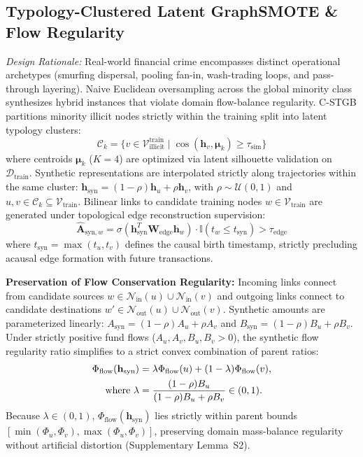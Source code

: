 \subsection{Typology-Clustered Latent GraphSMOTE \& Flow Regularity}
\label{sec:graph_smote}
\textit{Design Rationale:} Real-world financial crime encompasses distinct operational archetypes (smurfing dispersal, pooling fan-in, wash-trading loops, and pass-through layering). Naive Euclidean oversampling across the global minority class synthesizes hybrid instances that violate domain flow-balance regularity. C-STGB partitions minority illicit nodes strictly within the training split into latent typology clusters:
\begin{equation}
\mathcal{C}_k = \{ v \in \mathcal{V}_{\text{illicit}}^{\text{train}} \mid \cos(\mathbf{h}_v, \boldsymbol{\mu}_k) \ge \tau_{\text{sim}} \}
\end{equation}
where centroids $\boldsymbol{\mu}_k$ ($K=4$) are optimized via latent silhouette validation on $\mathcal{D}_{\text{train}}$. Synthetic representations are interpolated strictly along trajectories within the same cluster: $\mathbf{h}_{\text{syn}} = (1 - \rho) \mathbf{h}_u + \rho \mathbf{h}_v$, with $\rho \sim \mathcal{U}(0, 1)$ and $u, v \in \mathcal{C}_k \subseteq \mathcal{V}_{\text{train}}$. Bilinear links to candidate training nodes $w \in \mathcal{V}_{\text{train}}$ are generated under topological edge reconstruction supervision:
\begin{equation}
\hat{\mathbf{A}}_{\text{syn}, w} = \sigma\left( \mathbf{h}_{\text{syn}}^T \mathbf{W}_{\text{edge}} \mathbf{h}_w \right) \cdot \mathbb{I}(t_w \le t_{\text{syn}}) > \tau_{\text{edge}}
\end{equation}
where $t_{\text{syn}} = \max(t_u, t_v)$ defines the causal birth timestamp, strictly precluding acausal edge formation with future transactions.

\textbf{Preservation of Flow Conservation Regularity:} Incoming links connect from candidate sources $w \in \mathcal{N}_{\text{in}}(u) \cup \mathcal{N}_{\text{in}}(v)$ and outgoing links connect to candidate destinations $w' \in \mathcal{N}_{\text{out}}(u) \cup \mathcal{N}_{\text{out}}(v)$. Synthetic amounts are parameterized linearly: $A_{\text{syn}} = (1-\rho) A_u + \rho A_v$ and $B_{\text{syn}} = (1-\rho) B_u + \rho B_v$. Under strictly positive fund flows ($A_u, A_v, B_u, B_v > 0$), the synthetic flow regularity ratio simplifies to a strict convex combination of parent ratios:
\begin{align}
\Phi_{\text{flow}}(\mathbf{h}_{\text{syn}}) &= \lambda \Phi_{\text{flow}}(u) + (1-\lambda) \Phi_{\text{flow}}(v), \label{eq:synthetic_flow} \\
\text{where } \lambda &= \frac{(1-\rho) B_u}{(1-\rho) B_u + \rho B_v} \in (0, 1). \notag
\end{align}
Because $\lambda \in (0, 1)$, $\Phi_{\text{flow}}(\mathbf{h}_{\text{syn}})$ lies strictly within parent bounds $[\min(\Phi_u, \Phi_v), \max(\Phi_u, \Phi_v)]$, preserving domain mass-balance regularity without artificial distortion (Supplementary Lemma~S2).

